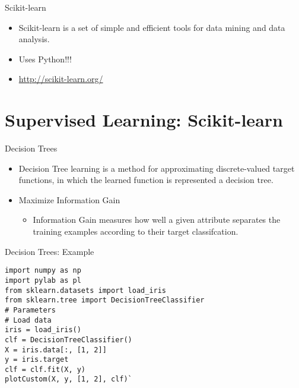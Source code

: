 \begin{frame}{Scikit-learn}

\begin{itemize}
\itemsep1pt\parskip0pt
\item
  Scikit-learn is a set of simple and efficient tools for data mining
  and data analysis.
\item
  Uses Python!!!
\item
  \url{http://scikit-learn.org/}
\end{itemize}

\end{frame}

\section{Supervised Learning:
Scikit-learn}\label{supervised-learning-scikit-learn}

\begin{frame}{Decision Trees}

\begin{itemize}
\itemsep1pt\parskip0pt
\item
  Decision Tree learning is a method for approximating discrete-valued
  target functions, in which the learned function is represented a
  decision tree.
\item
  Maximize Information Gain

  \begin{itemize}
  \itemsep1pt\parskip0pt
  \item
    Information Gain measures how well a given attribute separates the
    training examples according to their target classifcation.
  \end{itemize}
\end{itemize}

\end{frame}

\begin{frame}[fragile]{Decision Trees: Example}

\begin{verbatim}
import numpy as np
import pylab as pl
from sklearn.datasets import load_iris
from sklearn.tree import DecisionTreeClassifier
# Parameters
# Load data
iris = load_iris()
clf = DecisionTreeClassifier()
X = iris.data[:, [1, 2]]
y = iris.target
clf = clf.fit(X, y)
plotCustom(X, y, [1, 2], clf)`
\end{verbatim}

\end{frame}

